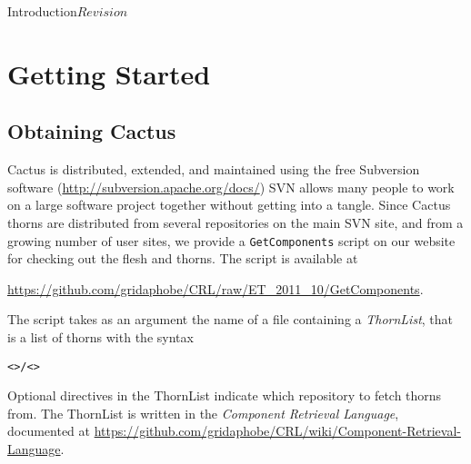 
\begin{cactuspart}{Introduction}{}{$Revision$}\label{part:Introduction}
\renewcommand{\thepage}{\Alph{part}\arabic{page}}


\chapter{Getting Started}
\label{cha:gs}


\section{Obtaining Cactus}
\label{sec:checkout}

Cactus is distributed, extended, and maintained using the free Subversion
software (\url{http://subversion.apache.org/docs/})
SVN allows many people to work on a large software project
together without getting into a tangle.
Since Cactus thorns are distributed from several repositories on the
main SVN site, and from a growing number of user sites, we provide a
\texttt{GetComponents} script on our website for checking out the flesh 
and thorns. The script is available at

\url{https://github.com/gridaphobe/CRL/raw/ET_2011_10/GetComponents}.

The
script takes as an argument the name of a file containing a \textit{ThornList},
that is a list of thorns with the syntax
\begin{alltt}
<>/<>
\end{alltt}

Optional directives in the ThornList indicate which repository to
fetch thorns from. The ThornList is written in the {\em Component
  Retrieval Language}, documented at
\url{https://github.com/gridaphobe/CRL/wiki/Component-Retrieval-Language}.


\end{cactuspart}
